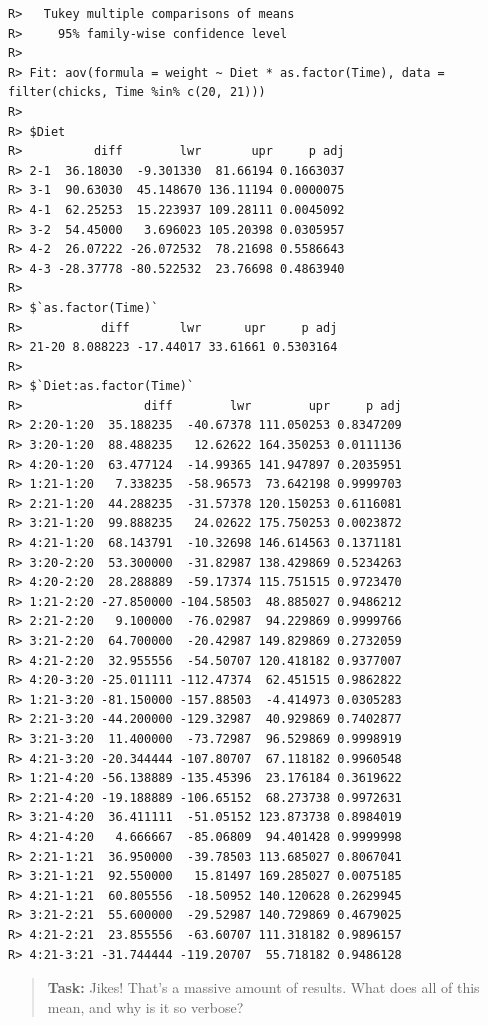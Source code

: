 \documentclass[english,10pt,a4paper,oneside]{book}
\theoremstyle{definition}
\theoremstyle{definition}
\theoremstyle{definition}
\theoremstyle{remark}
\begin{document}
\begin{verbatim}
R>   Tukey multiple comparisons of means
R>     95% family-wise confidence level
R> 
R> Fit: aov(formula = weight ~ Diet * as.factor(Time), data = filter(chicks, Time %in% c(20, 21)))
R> 
R> $Diet
R>          diff        lwr       upr     p adj
R> 2-1  36.18030  -9.301330  81.66194 0.1663037
R> 3-1  90.63030  45.148670 136.11194 0.0000075
R> 4-1  62.25253  15.223937 109.28111 0.0045092
R> 3-2  54.45000   3.696023 105.20398 0.0305957
R> 4-2  26.07222 -26.072532  78.21698 0.5586643
R> 4-3 -28.37778 -80.522532  23.76698 0.4863940
R> 
R> $`as.factor(Time)`
R>           diff       lwr      upr     p adj
R> 21-20 8.088223 -17.44017 33.61661 0.5303164
R> 
R> $`Diet:as.factor(Time)`
R>                 diff        lwr        upr     p adj
R> 2:20-1:20  35.188235  -40.67378 111.050253 0.8347209
R> 3:20-1:20  88.488235   12.62622 164.350253 0.0111136
R> 4:20-1:20  63.477124  -14.99365 141.947897 0.2035951
R> 1:21-1:20   7.338235  -58.96573  73.642198 0.9999703
R> 2:21-1:20  44.288235  -31.57378 120.150253 0.6116081
R> 3:21-1:20  99.888235   24.02622 175.750253 0.0023872
R> 4:21-1:20  68.143791  -10.32698 146.614563 0.1371181
R> 3:20-2:20  53.300000  -31.82987 138.429869 0.5234263
R> 4:20-2:20  28.288889  -59.17374 115.751515 0.9723470
R> 1:21-2:20 -27.850000 -104.58503  48.885027 0.9486212
R> 2:21-2:20   9.100000  -76.02987  94.229869 0.9999766
R> 3:21-2:20  64.700000  -20.42987 149.829869 0.2732059
R> 4:21-2:20  32.955556  -54.50707 120.418182 0.9377007
R> 4:20-3:20 -25.011111 -112.47374  62.451515 0.9862822
R> 1:21-3:20 -81.150000 -157.88503  -4.414973 0.0305283
R> 2:21-3:20 -44.200000 -129.32987  40.929869 0.7402877
R> 3:21-3:20  11.400000  -73.72987  96.529869 0.9998919
R> 4:21-3:20 -20.344444 -107.80707  67.118182 0.9960548
R> 1:21-4:20 -56.138889 -135.45396  23.176184 0.3619622
R> 2:21-4:20 -19.188889 -106.65152  68.273738 0.9972631
R> 3:21-4:20  36.411111  -51.05152 123.873738 0.8984019
R> 4:21-4:20   4.666667  -85.06809  94.401428 0.9999998
R> 2:21-1:21  36.950000  -39.78503 113.685027 0.8067041
R> 3:21-1:21  92.550000   15.81497 169.285027 0.0075185
R> 4:21-1:21  60.805556  -18.50952 140.120628 0.2629945
R> 3:21-2:21  55.600000  -29.52987 140.729869 0.4679025
R> 4:21-2:21  23.855556  -63.60707 111.318182 0.9896157
R> 4:21-3:21 -31.744444 -119.20707  55.718182 0.9486128
\end{verbatim}

\begin{quote}
\textbf{Task:} Jikes! That's a massive amount of results. What does all
of this mean, and why is it so verbose?
\end{quote}
\end{document}
